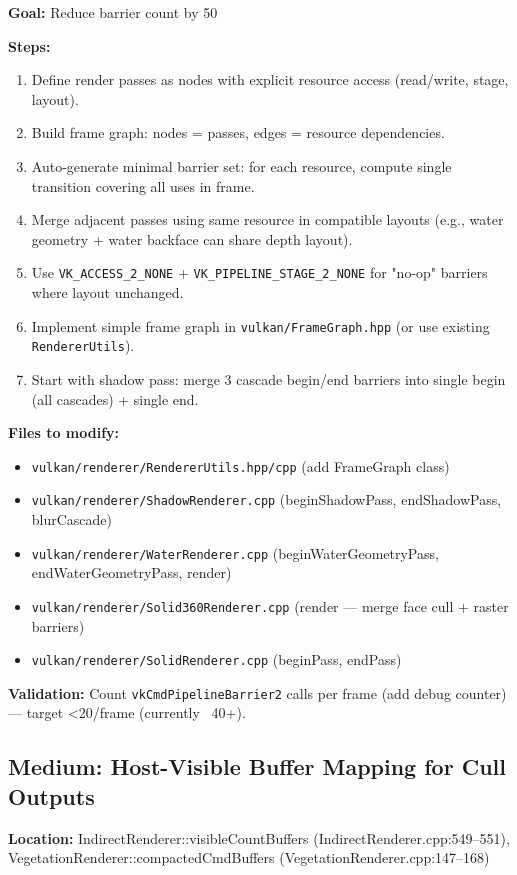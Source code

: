\documentclass[11pt,a4paper]{article}
\begin{document}
\begin{tcolorbox}[promptbox={Prompt: Consolidate Barrier Groups with Render Graph}]
\textbf{Goal:} Reduce barrier count by 50%

\textbf{Steps:}
\begin{enumerate}
    \item Define render passes as nodes with explicit resource access (read/write, stage, layout).
    \item Build frame graph: nodes = passes, edges = resource dependencies.
    \item Auto-generate minimal barrier set: for each resource, compute single transition covering all uses in frame.
    \item Merge adjacent passes using same resource in compatible layouts (e.g., water geometry + water backface can share depth layout).
    \item Use \texttt{VK\_ACCESS\_2\_NONE} + \texttt{VK\_PIPELINE\_STAGE\_2\_NONE} for "no-op" barriers where layout unchanged.
    \item Implement simple frame graph in \texttt{vulkan/FrameGraph.hpp} (or use existing \texttt{RendererUtils}).
    \item Start with shadow pass: merge 3 cascade begin/end barriers into single begin (all cascades) + single end.
\end{enumerate}

\textbf{Files to modify:}
\begin{itemize}
    \item \texttt{vulkan/renderer/RendererUtils.hpp/cpp} (add FrameGraph class)
    \item \texttt{vulkan/renderer/ShadowRenderer.cpp} (beginShadowPass, endShadowPass, blurCascade)
    \item \texttt{vulkan/renderer/WaterRenderer.cpp} (beginWaterGeometryPass, endWaterGeometryPass, render)
    \item \texttt{vulkan/renderer/Solid360Renderer.cpp} (render — merge face cull + raster barriers)
    \item \texttt{vulkan/renderer/SolidRenderer.cpp} (beginPass, endPass)
\end{itemize}

\textbf{Validation:} Count \texttt{vkCmdPipelineBarrier2} calls per frame (add debug counter) — target <20/frame (currently ~40+).
\end{tcolorbox}

\subsection{Medium: Host-Visible Buffer Mapping for Cull Outputs}
\textbf{Location:} IndirectRenderer::visibleCountBuffers (IndirectRenderer.cpp:549–551), VegetationRenderer::compactedCmdBuffers (VegetationRenderer.cpp:147–168)
\end{document}
